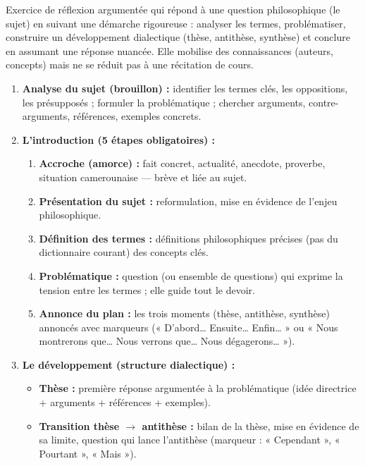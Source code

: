 \documentclass[11pt]{article}
\begin{document}
\begin{definition}
Exercice de réflexion argumentée qui répond à une question philosophique (le sujet) en suivant une démarche rigoureuse : analyser les termes, problématiser, construire un développement dialectique (thèse, antithèse, synthèse) et conclure en assumant une réponse nuancée. Elle mobilise des connaissances (auteurs, concepts) mais ne se réduit pas à une récitation de cours.
\end{definition}

\begin{methode}
\begin{enumerate}
\item \textbf{Analyse du sujet (brouillon) :} identifier les termes clés, les oppositions, les présupposés ; formuler la problématique ; chercher arguments, contre-arguments, références, exemples concrets.
\item \textbf{L'introduction (5 étapes obligatoires) :} 
      \begin{enumerate}
      \item \textbf{Accroche (amorce) :} fait concret, actualité, anecdote, proverbe, situation camerounaise — brève et liée au sujet.
      \item \textbf{Présentation du sujet :} reformulation, mise en évidence de l'enjeu philosophique.
      \item \textbf{Définition des termes :} définitions philosophiques précises (pas du dictionnaire courant) des concepts clés.
      \item \textbf{Problématique :} question (ou ensemble de questions) qui exprime la tension entre les termes ; elle guide tout le devoir.
      \item \textbf{Annonce du plan :} les trois moments (thèse, antithèse, synthèse) annoncés avec marqueurs (« D'abord… Ensuite… Enfin… » ou « Nous montrerons que… Nous verrons que… Nous dégagerons… »).
      \end{enumerate}
\item \textbf{Le développement (structure dialectique) :}
      \begin{itemize}
      \item \textbf{Thèse :} première réponse argumentée à la problématique (idée directrice + arguments + références + exemples).
      \item \textbf{Transition thèse $\rightarrow$ antithèse :} bilan de la thèse, mise en évidence de sa limite, question qui lance l'antithèse (marqueur : « Cependant », « Pourtant », « Mais »).

\end{itemize}
\end{enumerate}
\end{methode}
\end{document}
